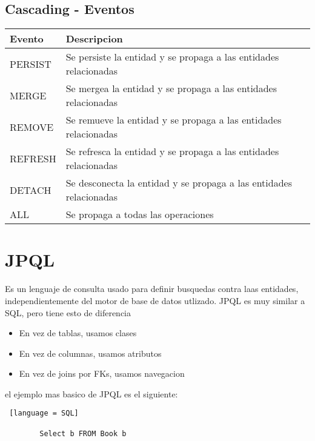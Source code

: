 \documentclass{article}
\begin{document}
\subsection*{Cascading - Eventos}


\begin{table}[h]
	\centering
	\begin{tabular}{|l|l|}
		\hline
		\textbf{Evento} & \textbf{Descripcion}                                               \\
		\hline
		PERSIST         & Se persiste la entidad y se propaga a las entidades relacionadas   \\
		MERGE           & Se mergea la entidad y se propaga a las entidades relacionadas     \\
		REMOVE          & Se remueve la entidad y se propaga a las entidades relacionadas    \\
		REFRESH         & Se refresca la entidad y se propaga a las entidades relacionadas   \\
		DETACH          & Se desconecta la entidad y se propaga a las entidades relacionadas \\
		ALL             & Se propaga a todas las operaciones                                 \\
		\hline
	\end{tabular}
\end{table}

\section*{JPQL}

Es un lenguaje de consulta usado para definir busquedas contra laas entidades, independientemente del motor de base de datos utlizado.
JPQL es muy similar a SQL, pero tiene esto de diferencia
\begin{itemize}
	\item En vez de tablas, usamos clases
	\item En vez de columnas, usamos atributos
	\item En vez de joins por FKs, usamos navegacion
\end{itemize}

el ejemplo mas basico de JPQL es el siguiente:

\begin{lstlisting} [language = SQL]

        Select b FROM Book b
        
    \end{lstlisting}
\end{document}
